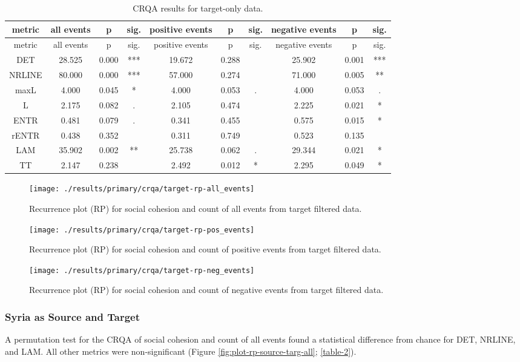 \documentclass[
  english,
  man]{apa6}
\begin{document}
\begin{longtable}[]{@{}cccccccccc@{}}
\caption{\label{table-1}CRQA results for target-only data.}\tabularnewline
\toprule
metric & all events & p & sig. & positive events & p & sig. & negative events & p & sig.\tabularnewline
\midrule
\endfirsthead
\toprule
metric & all events & p & sig. & positive events & p & sig. & negative events & p & sig.\tabularnewline
\midrule
\endhead
DET & 28.525 & 0.000 & *** & 19.672 & 0.288 & & 25.902 & 0.001 & ***\tabularnewline
NRLINE & 80.000 & 0.000 & *** & 57.000 & 0.274 & & 71.000 & 0.005 & **\tabularnewline
maxL & 4.000 & 0.045 & * & 4.000 & 0.053 & . & 4.000 & 0.053 & .\tabularnewline
L & 2.175 & 0.082 & . & 2.105 & 0.474 & & 2.225 & 0.021 & *\tabularnewline
ENTR & 0.481 & 0.079 & . & 0.341 & 0.455 & & 0.575 & 0.015 & *\tabularnewline
rENTR & 0.438 & 0.352 & & 0.311 & 0.749 & & 0.523 & 0.135 &\tabularnewline
LAM & 35.902 & 0.002 & ** & 25.738 & 0.062 & . & 29.344 & 0.021 & *\tabularnewline
TT & 2.147 & 0.238 & & 2.492 & 0.012 & * & 2.295 & 0.049 & *\tabularnewline
\bottomrule
\end{longtable}

\begin{figure}
\texttt{[image: ./results/primary/crqa/target-rp-all\_events]} \caption{Recurrence plot (RP) for social cohesion and count of all events from target filtered data.}\label{fig:plot-rp-targ-all}
\end{figure}

\begin{figure}
\texttt{[image: ./results/primary/crqa/target-rp-pos\_events]} \caption{Recurrence plot (RP) for social cohesion and count of positive events from target filtered data.}\label{fig:plot-rp-targ-pos}
\end{figure}

\begin{figure}
\texttt{[image: ./results/primary/crqa/target-rp-neg\_events]} \caption{Recurrence plot (RP) for social cohesion and count of negative events from target filtered data.}\label{fig:plot-rp-targ-neg}
\end{figure}

\hypertarget{syria-as-source-and-target}{%
\subsubsection{Syria as Source and Target}\label{syria-as-source-and-target}}

A permutation test for the CRQA of social cohesion and count of all events found
a statistical difference from chance for DET, NRLINE, and LAM. All other metrics
were non-significant (Figure \ref{fig:plot-rp-source-targ-all};
\autoref{table-2}).
\end{document}
